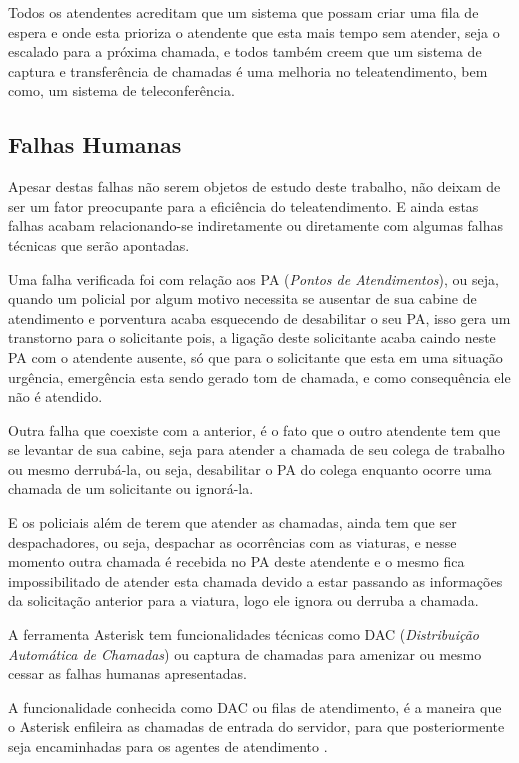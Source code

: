 Todos os atendentes acreditam que um sistema que possam criar uma fila de espera e onde esta prioriza o atendente que esta mais tempo sem atender, seja o escalado para a próxima chamada, e todos também creem que um sistema de captura e transferência de chamadas é uma melhoria no teleatendimento, bem como, um sistema de teleconferência.

\subsection{Falhas Humanas}
Apesar destas falhas não serem objetos de estudo deste trabalho, não deixam de ser um fator preocupante para a eficiência do teleatendimento. E ainda estas falhas acabam relacionando-se indiretamente ou diretamente com algumas falhas técnicas que serão apontadas.

Uma falha verificada foi com relação aos PA (\textit{Pontos de Atendimentos}), ou seja, quando um policial por algum motivo necessita se ausentar de sua cabine de atendimento e porventura acaba esquecendo de desabilitar o seu PA, isso gera um transtorno para o solicitante pois, a ligação deste solicitante acaba caindo neste PA com o atendente ausente, só que para o solicitante que esta em uma situação urgência, emergência esta sendo gerado tom de chamada, e como consequência ele não é atendido.

Outra falha que coexiste com a anterior, é o fato que o outro atendente tem que se levantar de sua cabine, seja para atender a chamada de seu colega de trabalho ou mesmo derrubá-la, ou seja, desabilitar o PA do colega enquanto ocorre uma chamada de um solicitante ou ignorá-la.

E os policiais além de terem que atender as chamadas, ainda tem que ser despachadores, ou seja, despachar as ocorrências com as viaturas, e nesse momento outra chamada é recebida no PA deste atendente e o mesmo fica impossibilitado de atender esta chamada devido a estar passando as informações da solicitação anterior para a viatura, logo ele ignora ou derruba a chamada.

A ferramenta Asterisk tem funcionalidades técnicas como DAC (\textit{Distribuição Automática de Chamadas}) ou captura de chamadas para amenizar ou mesmo cessar as falhas humanas apresentadas.

A funcionalidade conhecida como DAC ou filas de atendimento, é a maneira que o Asterisk enfileira as chamadas de entrada do servidor, para que posteriormente seja encaminhadas para os agentes de atendimento \cite{flavioeduardoandredade2005}.

